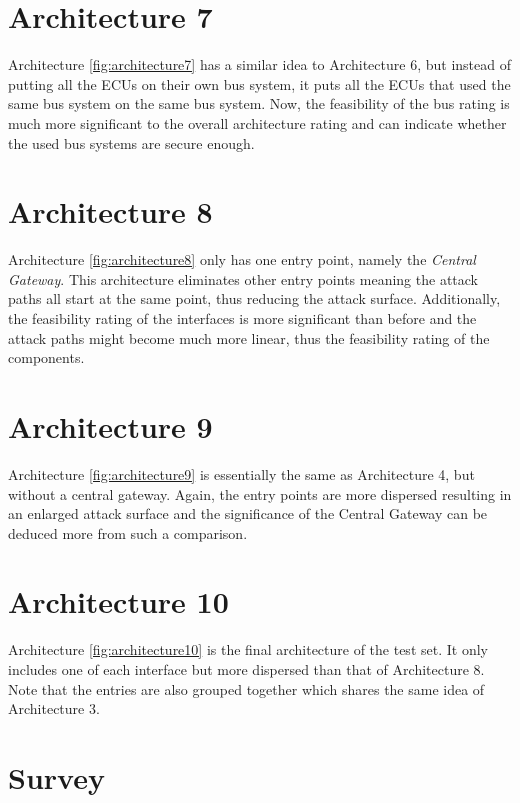 \section{Architecture 7}
\label{subsec:arch7}

Architecture \ref{fig:architecture7} has a similar idea to Architecture 6, 
but instead of putting all the ECUs on their own bus system, it puts all the ECUs that used the same bus system on the same bus system. 
Now, the feasibility of the bus rating is much more significant to the overall architecture rating and can indicate whether the used bus systems are secure enough.

\section{Architecture 8}
\label{subsec:arch8}

Architecture \ref{fig:architecture8} only has one entry point, namely the \textit{Central Gateway}. 
This architecture eliminates other entry points meaning the attack paths all start at the same point, thus reducing the attack surface. 
Additionally, the feasibility rating of the interfaces is more significant than before and the attack paths might become much more linear, 
thus the feasibility rating of the components.

\section{Architecture 9}
\label{subsec:arch9}

Architecture \ref{fig:architecture9} is essentially the same as Architecture 4, 
but without a central gateway. Again, the entry points are more dispersed resulting in an enlarged attack surface 
and the significance of the Central Gateway can be deduced more from such a comparison.

\section{Architecture 10}
\label{subsec:arch10}

Architecture \ref{fig:architecture10} is the final architecture of the test set. 
It only includes one of each interface but more dispersed than that of Architecture 8. 
Note that the entries are also grouped together which shares the same idea of Architecture 3.

\section{Survey}
\label{sec:survey}

